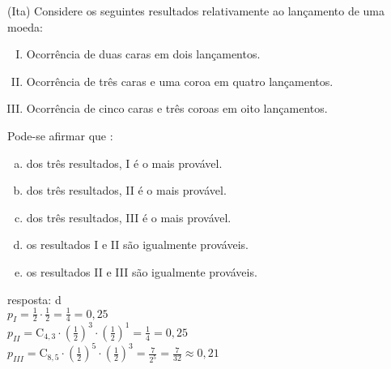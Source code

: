 \begin{ex}
 (Ita) Considere os seguintes resultados relativamente ao lançamento de uma moeda:
   \begin{enumerate} [I.]
       \item 	Ocorrência de duas caras em dois lançamentos. 
       \item Ocorrência de três caras e uma coroa em quatro lançamentos.
       \item Ocorrência de cinco caras e três coroas em oito lançamentos. 
   \end{enumerate}
  Pode-se afirmar que :
   \begin{enumerate} [(a)]
       \item dos três resultados, I é o mais provável.
       \item dos três resultados, II é o mais provável. 
       \item dos três resultados, III é o mais provável.
       \item os resultados I e II são igualmente prováveis.
       \item os resultados II e III são igualmente prováveis.
   \end{enumerate}
     \begin{sol}
     resposta: d \\
     $p_I= \frac{1}{2}\cdot\frac{1}{2}=\frac{1}{4}=0,25$ \\
     $p_{II}=\mathrm{C}_{4,3}\cdot(\frac{1}{2})^3\cdot(\frac{1}{2})^1=\frac{1}{4}=0,25$ \\
     $p_{III}=\mathrm{C}_{8,5}\cdot(\frac{1}{2})^5\cdot(\frac{1}{2})^3=\frac{7}{2^5}=\frac{7}{32}\approx 0,21$
     \end{sol}
\end{ex}